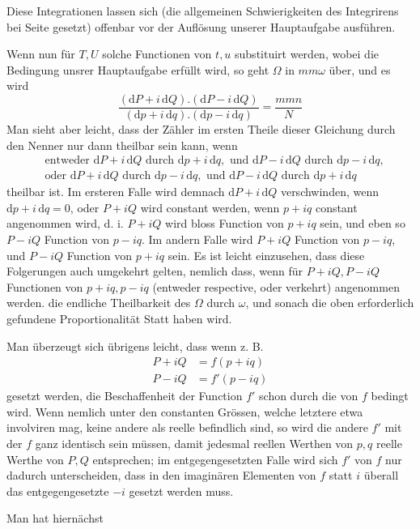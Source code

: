 \par\indent{}%
Diese Integrationen lassen sich (die allgemeinen Schwierigkeiten des Integrirens bei Seite gesetzt) offenbar vor der Auflösung unserer Hauptaufgabe ausführen.

Wenn nun für \(T,U\) solche Functionen von \(t,u\) substituirt werden, wobei die Bedingung unsrer Hauptaufgabe erfüllt wird, so geht \(\Omega\) in \(mm\omega\) über, und es wird
\[
\frac{(\mathrm{d}P+i\,\mathrm{d}Q)\mathord{.}(\mathrm{d}P-i\,\mathrm{d}Q)}{(\mathrm{d}p+i\,\mathrm{d}q)\mathord{.}(\mathrm{d}p-i\,\mathrm{d}q)}=\frac{mmn}{N}
\]
\noindent Man sieht aber leicht, dass der Zähler im ersten Theile dieser Gleichung durch den Nenner nur dann theilbar sein kann, wenn
\[
\begin{aligned}
&\text{entweder }\mathrm{d}P+i\,\mathrm{d}Q\text{ durch }\mathrm{d}p+i\,\mathrm{d}q,\text{ und }\mathrm{d}P-i\,\mathrm{d}Q\text{ durch }\mathrm{d}p-i\,\mathrm{d}q,\\
&\text{oder }\mathrm{d}P+i\,\mathrm{d}Q\text{ durch }\mathrm{d}p-i\,\mathrm{d}q,\text{ und }\mathrm{d}P-i\,\mathrm{d}Q\text{ durch }\mathrm{d}p+i\,\mathrm{d}q
\end{aligned}
\]
\noindent theilbar ist. Im ersteren Falle wird demnach \(\mathrm{d}P+i\,\mathrm{d}Q\) verschwinden, wenn \(\mathrm{d}p+i\,\mathrm{d}q=0\), oder \(P+iQ\) wird constant werden, wenn \(p+iq\) constant angenommen wird, d. i. \(P+iQ\) wird bloss Function von \(p+iq\) sein, und eben so \(P-iQ\) Function von \(p-iq\). Im andern Falle wird \(P+iQ\) Function von \(p-iq\), und \(P-iQ\) Function von \(p+iq\) sein. Es ist leicht einzusehen, dass diese Folgerungen auch umgekehrt gelten, nemlich dass, wenn für \(P+iQ,P-iQ\) Functionen von \(p+iq,p-iq\) (entweder respective, oder verkehrt) angenommen werden. die endliche Theilbarkeit des \(\Omega\) durch \(\omega\), und sonach die oben erforderlich gefundene Proportionalität Statt haben wird.

Man überzeugt sich übrigens leicht, dass wenn z. B.
\[
\begin{aligned}
P+iQ&=f(p+iq)\\
P-iQ&=f'(p-iq)
\end{aligned}
\]
\noindent gesetzt werden, die Beschaffenheit der Function \(f'\) schon durch die von \(f\) bedingt wird. Wenn nemlich unter den constanten Grössen, welche letztere etwa involviren mag, keine andere als reelle befindlich sind, so wird die andere \(f'\) mit der \(f\) ganz identisch sein müssen, damit jedesmal reellen Werthen von \(p,q\) reelle Werthe von \(P,Q\) entsprechen; im entgegengesetzten Falle wird sich \(f'\) von \(f\) nur dadurch unterscheiden, dass in den imaginären Elementen von \(f\) statt \(i\) überall das entgegengesetzte \(-i\) gesetzt werden muss.

Man hat hiernächst
